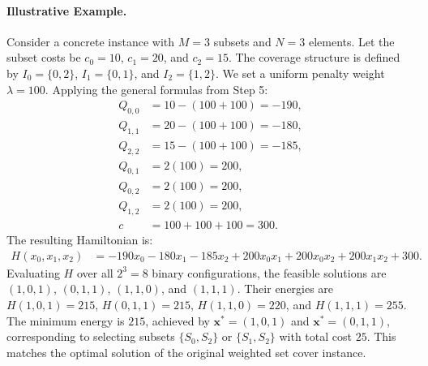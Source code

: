 \documentclass[12pt]{article}
\begin{document}
\paragraph{Illustrative Example.}
Consider a concrete instance with $M=3$ subsets and $N=3$ elements. Let the subset costs be $c_0 = 10$, $c_1 = 20$, and $c_2 = 15$. The coverage structure is defined by $I_0 = \{0, 2\}$, $I_1 = \{0, 1\}$, and $I_2 = \{1, 2\}$. We set a uniform penalty weight $\lambda = 100$. Applying the general formulas from Step 5:
\begin{align}
Q_{0,0} &= 10 - (100 + 100) = -190, \\
Q_{1,1} &= 20 - (100 + 100) = -180, \\
Q_{2,2} &= 15 - (100 + 100) = -185, \\
Q_{0,1} &= 2(100) = 200, \\
Q_{0,2} &= 2(100) = 200, \\
Q_{1,2} &= 2(100) = 200, \\
c &= 100 + 100 + 100 = 300.
\end{align}
The resulting Hamiltonian is:
\begin{align}
H(x_0, x_1, x_2) &= -190x_0 - 180x_1 - 185x_2 + 200x_0x_1 + 200x_0x_2 + 200x_1x_2 + 300.
\end{align}
Evaluating $H$ over all $2^3 = 8$ binary configurations, the feasible solutions are $(1,0,1)$, $(0,1,1)$, $(1,1,0)$, and $(1,1,1)$. Their energies are $H(1,0,1) = 215$, $H(0,1,1) = 215$, $H(1,1,0) = 220$, and $H(1,1,1) = 255$. The minimum energy is $215$, achieved by $\mathbf{x}^* = (1,0,1)$ and $\mathbf{x}^* = (0,1,1)$, corresponding to selecting subsets $\{S_0, S_2\}$ or $\{S_1, S_2\}$ with total cost $25$. This matches the optimal solution of the original weighted set cover instance.
\end{document}
